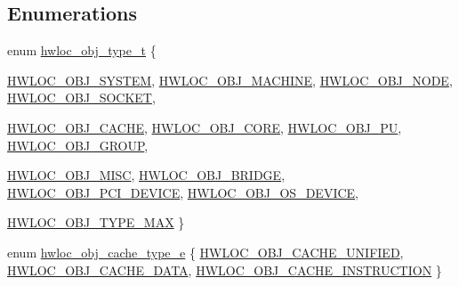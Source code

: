 \subsection*{Enumerations}
\begin{DoxyCompactItemize}
\item 
enum \hyperlink{a00041_gacd37bb612667dc437d66bfb175a8dc55}{hwloc\_\-obj\_\-type\_\-t} \{ \par
\hyperlink{a00041_ggacd37bb612667dc437d66bfb175a8dc55a3aa1b842d1fd4207ebce171f95a244ec}{HWLOC\_\-OBJ\_\-SYSTEM}, 
\hyperlink{a00041_ggacd37bb612667dc437d66bfb175a8dc55a3f4e83ffc4a259354959ae8a9eaa2a80}{HWLOC\_\-OBJ\_\-MACHINE}, 
\hyperlink{a00041_ggacd37bb612667dc437d66bfb175a8dc55aaf0964881117bdedf1a5e9332cd120dd}{HWLOC\_\-OBJ\_\-NODE}, 
\hyperlink{a00041_ggacd37bb612667dc437d66bfb175a8dc55a1ac6e07775ae4324b3fe9dbd72c785ec}{HWLOC\_\-OBJ\_\-SOCKET}, 
\par
\hyperlink{a00041_ggacd37bb612667dc437d66bfb175a8dc55a56ee0b7eca88f363b75b34fdde8c9ddc}{HWLOC\_\-OBJ\_\-CACHE}, 
\hyperlink{a00041_ggacd37bb612667dc437d66bfb175a8dc55ac793958f330bca371aa1535de8aff45f}{HWLOC\_\-OBJ\_\-CORE}, 
\hyperlink{a00041_ggacd37bb612667dc437d66bfb175a8dc55abca6887e80cb291353b0a0c1da83f661}{HWLOC\_\-OBJ\_\-PU}, 
\hyperlink{a00041_ggacd37bb612667dc437d66bfb175a8dc55a5269ef95be72f88465559d35c9b7ad56}{HWLOC\_\-OBJ\_\-GROUP}, 
\par
\hyperlink{a00041_ggacd37bb612667dc437d66bfb175a8dc55a19f8a6953fa91efc76bcbcdf2d22de4d}{HWLOC\_\-OBJ\_\-MISC}, 
\hyperlink{a00041_ggacd37bb612667dc437d66bfb175a8dc55a6825f10895fea60aca7a6ba9fe273db0}{HWLOC\_\-OBJ\_\-BRIDGE}, 
\hyperlink{a00041_ggacd37bb612667dc437d66bfb175a8dc55a5d8117a54df1fbd3606ab19e42cb0ea9}{HWLOC\_\-OBJ\_\-PCI\_\-DEVICE}, 
\hyperlink{a00041_ggacd37bb612667dc437d66bfb175a8dc55a51e7280240fd9f25589cbbe538bdb075}{HWLOC\_\-OBJ\_\-OS\_\-DEVICE}, 
\par
\hyperlink{a00041_ggacd37bb612667dc437d66bfb175a8dc55addb5f843e1812445a84e6b2a844b1ebc}{HWLOC\_\-OBJ\_\-TYPE\_\-MAX}
 \}
\item 
enum \hyperlink{a00041_ga791c9875c8fe20f3e1e5871e0657e59b}{hwloc\_\-obj\_\-cache\_\-type\_\-e} \{ \hyperlink{a00041_gga791c9875c8fe20f3e1e5871e0657e59ba3900b3b2db54941aac249e5a638a2d7a}{HWLOC\_\-OBJ\_\-CACHE\_\-UNIFIED}, 
\hyperlink{a00041_gga791c9875c8fe20f3e1e5871e0657e59bacac60ecad4206f85aeb79bef1604b488}{HWLOC\_\-OBJ\_\-CACHE\_\-DATA}, 
\hyperlink{a00041_gga791c9875c8fe20f3e1e5871e0657e59ba6f98b0d422b38ba90c5f5c79a11b0658}{HWLOC\_\-OBJ\_\-CACHE\_\-INSTRUCTION}
 \}
\item 

\end{DoxyCompactItemize}
